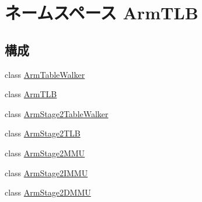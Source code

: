 \hypertarget{namespaceArmTLB}{
\section{ネームスペース ArmTLB}
\label{namespaceArmTLB}
}
\subsection*{構成}
\begin{DoxyCompactItemize}
\item 
class \hyperlink{classArmTLB_1_1ArmTableWalker}{ArmTableWalker}
\item 
class \hyperlink{classArmTLB_1_1ArmTLB}{ArmTLB}
\item 
class \hyperlink{classArmTLB_1_1ArmStage2TableWalker}{ArmStage2TableWalker}
\item 
class \hyperlink{classArmTLB_1_1ArmStage2TLB}{ArmStage2TLB}
\item 
class \hyperlink{classArmTLB_1_1ArmStage2MMU}{ArmStage2MMU}
\item 
class \hyperlink{classArmTLB_1_1ArmStage2IMMU}{ArmStage2IMMU}
\item 
class \hyperlink{classArmTLB_1_1ArmStage2DMMU}{ArmStage2DMMU}
\end{DoxyCompactItemize}
